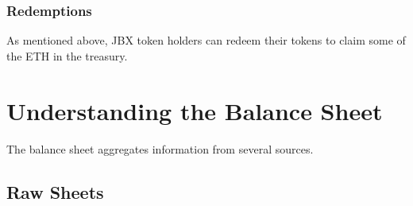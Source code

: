 \documentclass{article}
\begin{document}
\subsubsection{Redemptions}

As mentioned above, JBX token holders can redeem their tokens to claim some of the ETH in the treasury.

\section{Understanding the Balance Sheet}

The balance sheet aggregates information from several sources.

\subsection{Raw Sheets}
\end{document}
